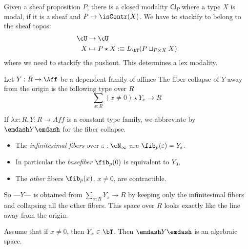 \begin{definition}
	Given a sheaf proposition $P$, there is a closed modality $\mathsf{Cl}_P$ where a type $X$ is modal, if it is a sheaf and $P \to \isContr(X)$.
	We have to stackify to belong to the sheaf topos:
	\begin{align*}
		\cU &\to \cU \\
		X &\mapsto P \star X :\equiv L_\bT(P \sqcup_{P \times X} X)
	\end{align*}
	where we need to stackify the pushout. This determines a lex modality.
\end{definition}
\begin{definition}
	Let $Y : R \to \Aff$ be a dependent family of affines %
	The fiber collapse of $Y$ away from the origin is the following type over $R$
	\[
	\sum_{x : R} (x \neq 0) \star Y_x \to R %
	\]
\end{definition}
\begin{notation}
	If $\lambda x : R , Y : R \to Aff$ is a constant type family, we abbreviate by $\emdash Y \emdash $ for the fiber collapse.
\end{notation}
\begin{itemize}
	\item The \emph{infinitesimal fibers} over $\varepsilon : \cN_\infty$ are $\fib_p(\varepsilon) = Y_\varepsilon$. 
	\item In particular the \emph{basefiber} $\fib_p (0)$ is equivalent to $Y_0$, 
	\item The \emph{other} fibers $\fib_p (x)$, $x \neq 0$, are contractible. 
\end{itemize}
So ---$Y$--- is obtained from $\sum_{x : R} Y_x \to R$ by keeping only the infinitesimal fibers and collapsing all the other fibers.
This space over $R$ looks exactly like the line away from the origin. %
\begin{lemma}{\label{lemma:FiberCollapsAS}}
	Assume that if $x \neq 0$, then $Y_x \in \bT$. Then $\emdash Y \emdash$ is an algebraic space.
\end{lemma}

